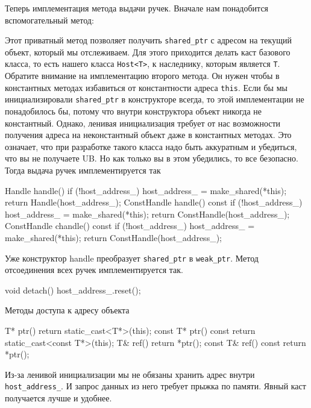 Теперь имплементация метода выдачи ручек.
Вначале нам понадобится вспомогательный метод:
\begin{cppcode}
static shared_ptr<T*> sharedOn(Host& host) {
  return make_shared(static_cast<T*>(&host)); } // Downcast
};
static shared_ptr<T*> sharedOn(const Host& host) {
  return make_shared(static_cast<T*>(&const_cast<Host&>(host))); } // Downcast
};
\end{cppcode}
Этот приватный метод позволяет получить \verb"shared_ptr" с адресом на текущий объект, который мы отслеживаем.
Для этого приходится делать каст базового класса, то есть нашего класса \verb"Host<T>", к наследнику, которым является \verb"T".
Обратите внимание на имплементацию второго метода.
Он нужен чтобы в константных методах избавиться от константности адреса \verb"this".
Если бы мы инициализировали \verb"shared_ptr" в конструкторе всегда, то этой имплементации не понадобилось бы, потому что внутри конструктора объект никогда не константный.
Однако, ленивая инициализация требует от нас возможности получения адреса на неконстантный объект даже в константных методах.
Это означает, что при разработке такого класса надо быть аккуратным и убедиться, что вы не получаете UB.
Но как только вы в этом убедились, то все безопасно.
Тогда выдача ручек имплементируется так
\begin{cppcode}
Handle handle() {
  if (!host_address_)
    host_address_ = make_shared(*this);
  return Handle(host_address_);
}
ConstHandle handle() const {
  if (!host_address_)
    host_address_ = make_shared(*this);
  return ConstHandle(host_address_);
}
ConstHandle chandle() const {
  if (!host_address_)
    host_address_ = make_shared(*this);
  return ConstHandle(host_address_);
}
\end{cppcode}
Уже конструктор handle преобразует \verb"shared_ptr" в \verb"weak_ptr".
Метод отсоединения всех ручек имплементируется так.
\begin{cppcode}
void detach() {
  host_address_.reset();
}
\end{cppcode}
Методы доступа к адресу объекта
\begin{cppcode}
  T* ptr() {
    return static_cast<T*>(this);
  }
  const T* ptr() const {
    return static_cast<const T*>(this);
  }
  T& ref() {
    return *ptr();
  }
  const T& ref() const {
    return *ptr();
  }  
\end{cppcode}
Из-за ленивой инициализации мы не обязаны хранить адрес внутри \verb"host_address_".
И запрос данных из него требует прыжка по памяти.
Явный каст получается лучше и удобнее.

